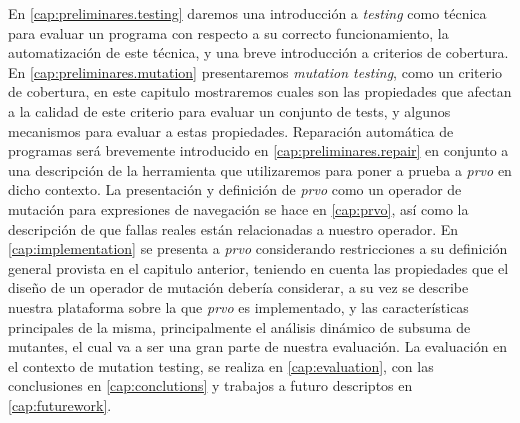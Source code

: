 En \ref{cap:preliminares.testing} daremos una introducci\'on a \emph{testing} como t\'ecnica para evaluar un programa con respecto a su correcto funcionamiento, la automatizaci\'on de este t\'ecnica, y una breve introducci\'on a criterios de cobertura. En \ref{cap:preliminares.mutation} presentaremos \emph{mutation testing}, como un criterio de cobertura, en este capitulo mostraremos cuales son las propiedades que afectan a la calidad de este criterio para evaluar un conjunto de tests, y algunos mecanismos para evaluar a estas propiedades. Reparaci\'on autom\'atica de programas ser\'a brevemente introducido en \ref{cap:preliminares.repair} en conjunto a una descripci\'on de la herramienta que utilizaremos para poner a prueba a \emph{prvo} en dicho contexto. La presentaci\'on y definici\'on de \emph{prvo} como un operador de mutaci\'on para expresiones de navegaci\'on se hace en \ref{cap:prvo}, as\'i como la descripci\'on de que fallas reales est\'an relacionadas a nuestro operador. En \ref{cap:implementation} se presenta a \emph{prvo} considerando restricciones a su definici\'on general provista en el capitulo anterior, teniendo en cuenta las propiedades que el dise\~no de un operador de mutaci\'on deber\'ia considerar, a su vez se describe nuestra plataforma sobre la que \emph{prvo} es implementado, y las caracter\'isticas principales de la misma, principalmente el an\'alisis din\'amico de subsuma de mutantes, el cual va a ser una gran parte de nuestra evaluaci\'on. La evaluaci\'on en el contexto de mutation testing, se realiza en 
\ref{cap:evaluation}, con las conclusiones en \ref{cap:conclutions} y trabajos a futuro descriptos en \ref{cap:futurework}.

